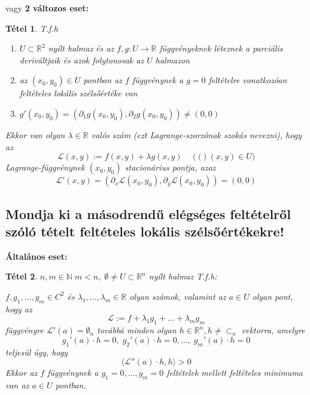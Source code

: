 \documentclass[12pt,a4paper]{article}
\newcommand{\R}{\mathbb{R}}
\newcommand{\N}{\mathbb{N}}
\newcommand{\CL}{\mathcal{L}}
\newcommand{\bb}[1]{\left( #1 \right)}
\newcommand{\angels}[1]{\langle #1 \rangle}
\newtheorem{tet}{Tétel}[section]
\begin{document}
vagy 
\textbf{2 változos eset:}
\begin{tet}
T.f.h
\begin{enumerate}
\item[(a)] $U \subset \R^2 $ nyílt halmaz és az $f,g : U \to \R $ függvényeknek léteznek a parciális deriváltjaik és azok folytonosak az $U$ halmazon
\item[(b)] az $(x_0,y_0) \in U $ pontban az $f$ függvénynek a $g = 0$ feltételre vonatkozóan feltételes lokális szélsőértéke van
\item[(c)] $g' (x_0,y_0) = \bb{\partial_1 g(x_0,y_0),\partial_2 g(x_0,y_0)} \neq (0,0)$
\end{enumerate}
Ekkor van olyan $\lambda \in \R$ valós szám (ezt Lagrange-szorzónak
szokás nevezni), hogy az
\[
\CL(x,y) := f(x,y) + \lambda g(x,y) \quad \bb((x,y)\in U)
\]
Lagrange-függvénynek $(x_0, y_0)$ stacionárius pontja, azaz
\[
\CL'(x,y) = \bb{\partial_x\CL(x_0,y_0),\partial_y\CL(x_0,y_0)} = (0,0)
\]
\end{tet}
\subsection{Mondja ki a másodrendű elégséges feltételről szóló tételt feltételes lokális szélsőértékekre!}
\textbf{Általános eset:}
\begin{tet}
$n,m \in \N \; m < n, \; \emptyset \neq U \subset \R^n$ nyílt halmaz T.f.h:

$f,g_1,\ldots,g_m \in C^2$  és $\lambda_1,\ldots, \lambda_m \in \R$ olyan számok, valamint az $a \in U$ olyan pont, hogy az
\[
\CL := f+ \lambda_1g_1 + \ldots + \lambda_mg_m
\]
függvényre $\CL'(a) = \emptyset_n$ továbbá minden olyan $h \in \R^n, h \neq \subset_n$ vektorra, amelyre
\[
g_1'(a) \cdot h = 0, \; g_2'(a) \cdot h = 0, \ldots , \; g_m'(a) \cdot h = 0
\]
teljesül úgy, hogy 
\[
\angels{\CL''(a) \cdot h,h} > 0
\]
Ekkor az $f$ függvénynek a $g_1 = 0, \ldots , g_m = 0$ feltételek
mellett feltételes minimuma van az $a \in U $ pontban.
\end{tet}
\end{document}
